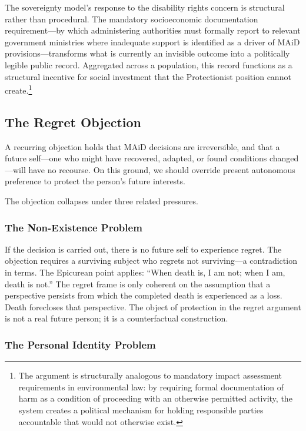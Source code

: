 \documentclass[11pt, letterpaper]{article}
\begin{document}
The sovereignty model's response to the disability rights concern is structural rather
than procedural. The mandatory socioeconomic documentation requirement---by which
administering authorities must formally report to relevant government ministries where
inadequate support is identified as a driver of MAiD provisions---transforms what is
currently an invisible outcome into a politically legible public record. Aggregated
across a population, this record functions as a structural incentive for social
investment that the Protectionist position cannot create.\footnote{%
  The argument is structurally analogous to mandatory impact assessment requirements
  in environmental law: by requiring formal documentation of harm as a condition of
  proceeding with an otherwise permitted activity, the system creates a political
  mechanism for holding responsible parties accountable that would not otherwise exist.}

\subsection{The Regret Objection}

A recurring objection holds that MAiD decisions are irreversible, and that a future
self---one who might have recovered, adapted, or found conditions changed---will have
no recourse. On this ground, we should override present autonomous preference to protect
the person's future interests.

The objection collapses under three related pressures.

\subsubsection{The Non-Existence Problem}

If the decision is carried out, there is no future self to experience regret. The
objection requires a surviving subject who regrets not surviving---a contradiction in
terms. The Epicurean point applies: ``When death is, I am not; when I am, death is
not.'' The regret frame is only coherent on the assumption that a perspective persists
from which the completed death is experienced as a loss. Death forecloses that
perspective. The object of protection in the regret argument is not a real future person;
it is a counterfactual construction.

\subsubsection{The Personal Identity Problem}
\end{document}
